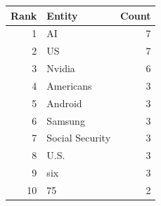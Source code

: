 \begin{tabular}{rlr}
\toprule
Rank & Entity & Count \\
\midrule
1 & AI & 7 \\
2 & US & 7 \\
3 & Nvidia & 6 \\
4 & Americans & 3 \\
5 & Android & 3 \\
6 & Samsung & 3 \\
7 & Social Security & 3 \\
8 & U.S. & 3 \\
9 & six & 3 \\
10 & 75 & 2 \\
\bottomrule
\end{tabular}
